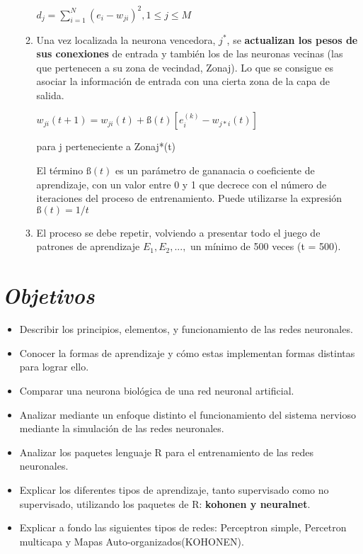\documentclass[journal]{IEEEtran}
\begin{document}
\begin{enumerate}
\begin{enumerate}
\begin{center}
$d_{j} = \sum_{i=1}^{N}(e_{i} - w_{ji})^2 , 1 \leq j \leq M$
\end{center}

\item Una vez localizada la neurona vencedora, $j^{*}$, se \textbf{actualizan los pesos de sus conexiones} de entrada y también los de las neuronas vecinas (las que pertenecen a su zona de vecindad, Zonaj). Lo que se consigue es asociar la información de entrada con una cierta zona de la capa de salida.

\begin{center}
$w_{ji}(t+1) = w_{ji}(t) + ß(t)[e_{i}^{(k)} - w_{j*i}(t)]$
\end{center}

para j perteneciente a Zonaj*(t)

El término $ß(t)$ es un parámetro de gananacia o coeficiente de aprendizaje, con un valor entre 0 y 1 que decrece con el número de iteraciones del proceso de entrenamiento. Puede utilizarse la expresión $ß(t) = 1/t$\\

\item El proceso se debe repetir, volviendo a presentar todo el juego de patrones de aprendizaje $E_{1}, E_{2},...,$ un mínimo de 500 veces (t = 500).\\
\end{enumerate}
\end{enumerate}
  
\section{\textbf{\emph{Objetivos}}}

\begin{itemize}
\item Describir los principios, elementos, y funcionamiento de las redes neuronales.
        
\item Conocer la formas de aprendizaje y cómo estas implementan formas distintas para lograr ello.

\item Comparar una neurona biológica de una red neuronal artificial.
        
\item Analizar mediante un enfoque distinto el funcionamiento del sistema nervioso mediante la simulación de las redes neuronales.

\item Analizar los paquetes lenguaje R para el entrenamiento de las redes neuronales.

\item Explicar los diferentes tipos de aprendizaje, tanto supervisado como no supervisado, utilizando los paquetes de R: \textbf{kohonen y neuralnet}.

 \item Explicar a fondo las siguientes tipos de redes: Perceptron simple, Percetron multicapa y Mapas Auto-organizados(KOHONEN).
\end{itemize}
  
\end{document}
